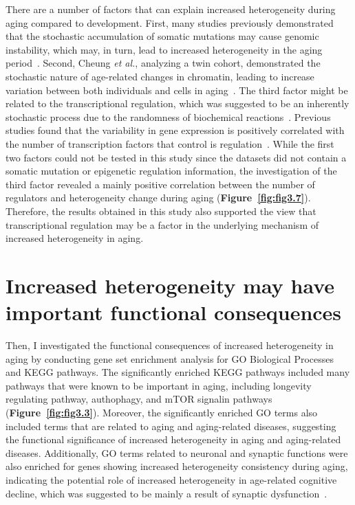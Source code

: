 There are a number of factors that can explain increased heterogeneity during aging compared to development.
First, many studies previously demonstrated that the stochastic accumulation of somatic mutations may cause genomic instability,
which may, in turn, lead to increased heterogeneity in the aging period~\autocite{Lu2004, Vijg2004, Lodato2018, Lombard2005}.
Second, Cheung \textit{et al.}, analyzing a twin cohort, demonstrated the stochastic nature of age-related changes in chromatin,
leading to increase variation between both individuals and cells in aging~\autocite{Cheung2018}.
The third factor might be related to the transcriptional regulation, which was suggested to be an inherently stochastic process due to the randomness of biochemical reactions~\autocite{Maheshri2007, Barroso2018}.
Previous studies found that the variability in gene expression is positively correlated with the number of transcription factors that control is regulation~\autocite{Barroso2018, Sharon2014}.
While the first two factors could not be tested in this study since the datasets did not contain a somatic mutation or epigenetic regulation information, 
the investigation of the third factor revealed a mainly positive correlation between the number of regulators and heterogeneity change during aging (\textbf{Figure~\ref{fig:fig3.7}}).
Therefore, the results obtained in this study also supported the view that transcriptional regulation may be a factor in the underlying mechanism of increased heterogeneity in aging. 
\section{Increased heterogeneity may have important functional consequences}
Then, I investigated the functional consequences of increased heterogeneity in aging by conducting gene set enrichment analysis for GO Biological Processes and KEGG pathways.
The significantly enriched KEGG pathways included many pathways that were known to be important in aging,
including longevity regulating pathway, authophagy, and mTOR signalin pathways (\textbf{Figure~\ref{fig:fig3.3}}).
Moreover, the significantly enriched GO terms also included terms that are related to aging and aging-related diseases,
suggesting the functional significance of increased heterogeneity in aging and aging-related diseases.
Additionally, GO terms related to neuronal and synaptic functions were also enriched for genes showing increased heterogeneity consistency during aging,
indicating the potential role of increased heterogeneity in age-related cognitive decline, which was suggested to be mainly a result of synaptic dysfunction~\autocite{Morrison2012}.

